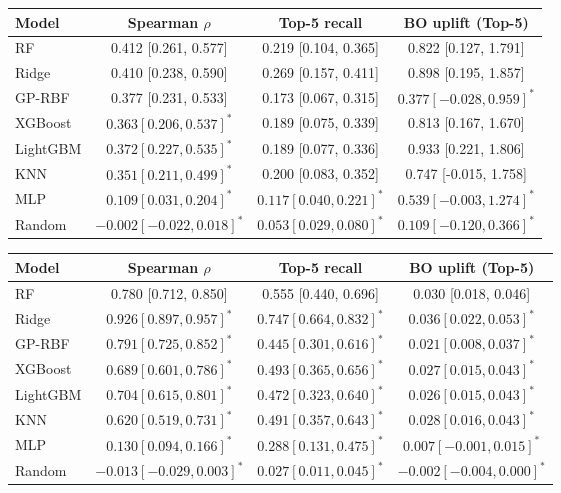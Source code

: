 \begin{tabular}{lccc}
\toprule
Model & Spearman $\rho$ & Top-5 recall & BO uplift (Top-5) \\
\midrule
RF & 0.412 [0.261, 0.577] & 0.219 [0.104, 0.365] & 0.822 [0.127, 1.791] \\
Ridge & 0.410 [0.238, 0.590] & 0.269 [0.157, 0.411] & 0.898 [0.195, 1.857] \\
GP-RBF & 0.377 [0.231, 0.533] & 0.173 [0.067, 0.315] & $0.377 [-0.028, 0.959]^{*}$ \\
XGBoost & $0.363 [0.206, 0.537]^{*}$ & 0.189 [0.075, 0.339] & 0.813 [0.167, 1.670] \\
LightGBM & $0.372 [0.227, 0.535]^{*}$ & 0.189 [0.077, 0.336] & 0.933 [0.221, 1.806] \\
KNN & $0.351 [0.211, 0.499]^{*}$ & 0.200 [0.083, 0.352] & 0.747 [-0.015, 1.758] \\
MLP & $0.109 [0.031, 0.204]^{*}$ & $0.117 [0.040, 0.221]^{*}$ & $0.539 [-0.003, 1.274]^{*}$ \\
Random & $-0.002 [-0.022, 0.018]^{*}$ & $0.053 [0.029, 0.080]^{*}$ & $0.109 [-0.120, 0.366]^{*}$ \\
\bottomrule
\end{tabular}

\begin{tabular}{lccc}
\toprule
Model & Spearman $\rho$ & Top-5 recall & BO uplift (Top-5) \\
\midrule
RF & 0.780 [0.712, 0.850] & 0.555 [0.440, 0.696] & 0.030 [0.018, 0.046] \\
Ridge & $0.926 [0.897, 0.957]^{*}$ & $0.747 [0.664, 0.832]^{*}$ & $0.036 [0.022, 0.053]^{*}$ \\
GP-RBF & $0.791 [0.725, 0.852]^{*}$ & $0.445 [0.301, 0.616]^{*}$ & $0.021 [0.008, 0.037]^{*}$ \\
XGBoost & $0.689 [0.601, 0.786]^{*}$ & $0.493 [0.365, 0.656]^{*}$ & $0.027 [0.015, 0.043]^{*}$ \\
LightGBM & $0.704 [0.615, 0.801]^{*}$ & $0.472 [0.323, 0.640]^{*}$ & $0.026 [0.015, 0.043]^{*}$ \\
KNN & $0.620 [0.519, 0.731]^{*}$ & $0.491 [0.357, 0.643]^{*}$ & $0.028 [0.016, 0.043]^{*}$ \\
MLP & $0.130 [0.094, 0.166]^{*}$ & $0.288 [0.131, 0.475]^{*}$ & $0.007 [-0.001, 0.015]^{*}$ \\
Random & $-0.013 [-0.029, 0.003]^{*}$ & $0.027 [0.011, 0.045]^{*}$ & $-0.002 [-0.004, 0.000]^{*}$ \\
\bottomrule
\end{tabular}
